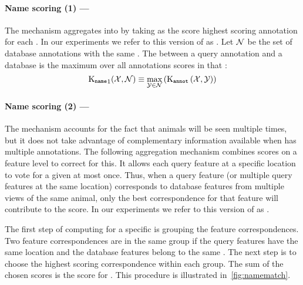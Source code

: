         \paragraph{Name scoring (1) --- \csumprefix{}} %
            The \cscoring{} mechanism aggregates \annotscores{} into
              \namescores{} by taking as the score highest scoring
              annotation for each \name{}.
            In our experiments we refer to this version of
              \namescoring{} as \csum{}.
            Let $\mathcal{N}$ be the set of database annotations with the same
              \name{}.
            The \cscore{} between a query annotation and a database
              \name{} is the maximum over all annotations scores in that
              \name{}:
            \begin{equation}
                \operatorname{K_{\tt name}}_1(\mathcal{X}, \mathcal{N}) 
                \equiv
                \max_{\mathcal{Y} \in \mathcal{N}}
                \left(
                    \operatorname{K_{\tt annot}}\left(\mathcal{X}, \mathcal{Y}\right)
                \right)
            \end{equation}

         \paragraph{Name scoring (2) --- \nsumprefix{}} %
            The \cscoring{} mechanism accounts for the fact that
              animals will be seen multiple times, but it does not take
              advantage of complementary information available when
              \aan{\name{}} has multiple annotations.
            The following aggregation mechanism combines scores on a
              feature level to correct for this.
            It allows each query feature at a specific location to vote
              for a given \name{} at most once.
            Thus, when a query feature (or multiple query features at
              the same location) corresponds to database features from
              multiple views of the same animal, only the best correspondence
              for that feature will contribute to the score.
            In our experiments we refer to this version of
              \namescoring{} as \nsum{}.

            The first step of computing \aan{\namescore{}} for a
              specific \name{} is grouping the feature correspondences.
            Two feature correspondences are in the same group if the
              query features have the same location and the database
              features belong to the same \name{}.
            The next step is to choose the highest scoring
              correspondence within each group.
            The sum of the chosen scores is the score for
              \aan{\name{}}.
            This procedure is illustrated in~\cref{fig:namematch}.

